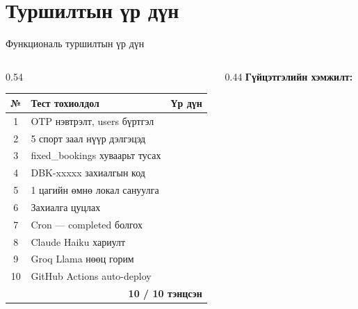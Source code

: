 \documentclass[14pt,aspectratio=169]{beamer}
\newcommand{\YES}{\textcolor{okgreen}{\checkmark}}
\begin{document}
\section{Туршилтын үр дүн}
\begin{frame}{Функциональ туршилтын үр дүн}
  \begin{columns}[T]
    \begin{column}{0.54\textwidth}
      \small
      \renewcommand{\arraystretch}{1.2}
      \begin{tabular}{clc}
        \toprule
        \rowcolor{navyblue}
        {\color{white}\textbf{№}} &
        {\color{white}\textbf{Тест тохиолдол}} &
        {\color{white}\textbf{Үр дүн}} \\
        \midrule
        \rowcolor{rowgray}
        1 & OTP нэвтрэлт, users бүртгэл & \YES \\
        2 & 5 спорт заал нүүр дэлгэцэд  & \YES \\
        \rowcolor{rowgray}
        3 & fixed\_bookings хуваарьт тусах & \YES \\
        4 & DBK-xxxxx захиалгын код        & \YES \\
        \rowcolor{rowgray}
        5 & 1 цагийн өмнө локал сануулга  & \YES \\
        6 & Захиалга цуцлах               & \YES \\
        \rowcolor{rowgray}
        7 & Cron — completed болгох        & \YES \\
        8 & Claude Haiku хариулт          & \YES \\
        \rowcolor{rowgray}
        9 & Groq Llama нөөц горим         & \YES \\
        10 & GitHub Actions auto-deploy   & \YES \\
        \bottomrule
        \multicolumn{3}{r}{\small\textbf{10 / 10 тэнцсэн}}
      \end{tabular}
    \end{column}
    \begin{column}{0.44\textwidth}
      \textbf{Гүйцэтгэлийн хэмжилт:}
      \vspace{6pt}


\end{column}
\end{columns}
\end{frame}
\end{document}
